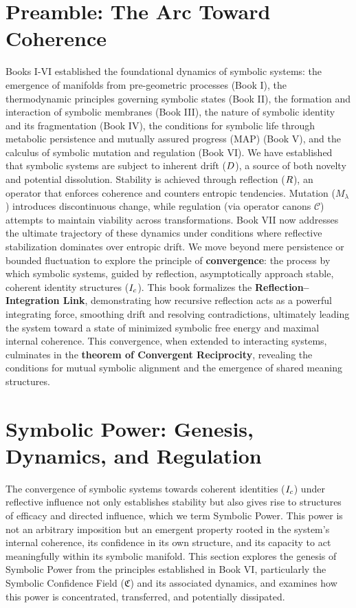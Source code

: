 \section{Preamble: The Arc Toward Coherence}
\label{sec:bk7_preamble_the_arc_toward_coherence} %
Books I-VI established the foundational dynamics of symbolic systems: the emergence of manifolds from pre-geometric processes (Book I), the thermodynamic principles governing symbolic states (Book II), the formation and interaction of symbolic membranes (Book III), the nature of symbolic identity and its fragmentation (Book IV), the conditions for symbolic life through metabolic persistence and mutually assured progress (MAP) (Book V), and the calculus of symbolic mutation and regulation (Book VI).
We have established that symbolic systems are subject to inherent drift (\(D\)), a source of both novelty and potential dissolution. Stability is achieved through reflection (\(R\)), an operator that enforces coherence and counters entropic tendencies. Mutation (\(M_\lambda\)) introduces discontinuous change, while regulation (via operator canons \(\mathcal{C}\)) attempts to maintain viability across transformations.
Book VII now addresses the ultimate trajectory of these dynamics under conditions where reflective stabilization dominates over entropic drift. We move beyond mere persistence or bounded fluctuation to explore the principle of \textbf{convergence}: the process by which symbolic systems, guided by reflection, asymptotically approach stable, coherent identity structures (\(I_c\)). This book formalizes the \textbf{Reflection–Integration Link}, demonstrating how recursive reflection acts as a powerful integrating force, smoothing drift and resolving contradictions, ultimately leading the system toward a state of minimized symbolic free energy and maximal internal coherence. This convergence, when extended to interacting systems, culminates in the \textbf{theorem of Convergent Reciprocity}, revealing the conditions for mutual symbolic alignment and the emergence of shared meaning structures.

\section{Symbolic Power: Genesis, Dynamics, and Regulation}
\label{sec:bk7_symbolic_power_genesis_dynamics_regulation}
The convergence of symbolic systems towards coherent identities (\(I_c\)) under reflective influence not only establishes stability but also gives rise to structures of efficacy and directed influence, which we term Symbolic Power. This power is not an arbitrary imposition but an emergent property rooted in the system's internal coherence, its confidence in its own structure, and its capacity to act meaningfully within its symbolic manifold. This section explores the genesis of Symbolic Power from the principles established in Book VI, particularly the Symbolic Confidence Field (\(\mathfrak{C}\)) and its associated dynamics, and examines how this power is concentrated, transferred, and potentially dissipated.

